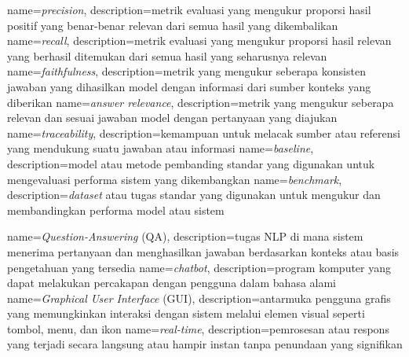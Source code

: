 {
	name={\textit{precision}},
	description={metrik evaluasi yang mengukur proporsi hasil positif yang benar-benar relevan dari semua hasil yang dikembalikan}
}
{
	name={\textit{recall}},
	description={metrik evaluasi yang mengukur proporsi hasil relevan yang berhasil ditemukan dari semua hasil yang seharusnya relevan}
}
{
	name={\textit{faithfulness}},
	description={metrik yang mengukur seberapa konsisten jawaban yang dihasilkan model dengan informasi dari sumber konteks yang diberikan}
}
{
	name={\textit{answer relevance}},
	description={metrik yang mengukur seberapa relevan dan sesuai jawaban model dengan pertanyaan yang diajukan}
}
{
	name={\textit{traceability}},
	description={kemampuan untuk melacak sumber atau referensi yang mendukung suatu jawaban atau informasi}
}
{
	name={\textit{baseline}},
	description={model atau metode pembanding standar yang digunakan untuk mengevaluasi performa sistem yang dikembangkan}
}
{
	name={\textit{benchmark}},
	description={\textit{dataset} atau tugas standar yang digunakan untuk mengukur dan membandingkan performa model atau sistem}
}

{
	name={\textit{Question-Answering} (QA)},
	description={tugas NLP di mana sistem menerima pertanyaan dan menghasilkan jawaban berdasarkan konteks atau basis pengetahuan yang tersedia}
}
{
	name={\textit{chatbot}},
	description={program komputer yang dapat melakukan percakapan dengan pengguna dalam bahasa alami}
}
{
	name={\textit{Graphical User Interface} (GUI)},
	description={antarmuka pengguna grafis yang memungkinkan interaksi dengan sistem melalui elemen visual seperti tombol, menu, dan ikon}
}
{
	name={\textit{real-time}},
	description={pemrosesan atau respons yang terjadi secara langsung atau hampir instan tanpa penundaan yang signifikan}
}

